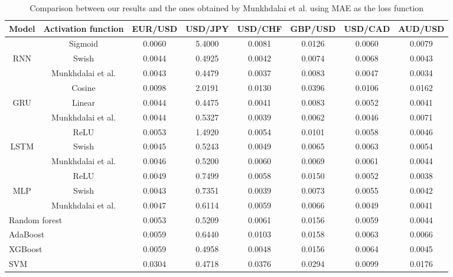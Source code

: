 ﻿\documentclass{ieeeaccess}
\begin{document}
\begin{table}[t]
  \caption{Comparison between our results and the ones obtained by Munkhdalai et al. using MAE as the loss function}
  \small
  \centering
  \begin{tabular*}{0.9\textwidth}{c @{\extracolsep{\fill}} ccccccc}
    \hline
    \textbf{Model} & \textbf{Activation function} & \textbf{EUR/USD} & \textbf{USD/JPY} & \textbf{USD/CHF} & \textbf{GBP/USD} & \textbf{USD/CAD} & \textbf{AUD/USD} \\
    \hline

          & Sigmoid & 0.0060 & 5.4000 & 0.0081 & 0.0126 & 0.0060 & 0.0079 \\
    RNN   & Swish & 0.0044 & 0.4925 & 0.0042 & 0.0074 & 0.0068 & 0.0043 \\
          & Munkhdalai et al. & 0.0043 & 0.4479 & 0.0037 & 0.0083 & 0.0047 & 0.0034 \\
    \hline
          & Cosine & 0.0098 & 2.0191 & 0.0130 & 0.0396 & 0.0106 & 0.0162 \\
    GRU   & Linear & 0.0044 & 0.4475 & 0.0041 & 0.0083 & 0.0052 & 0.0041 \\
          & Munkhdalai et al. & 0.0044 & 0.5327 & 0.0039 & 0.0062 & 0.0046 & 0.0071 \\
    \hline
          & ReLU & 0.0053 & 1.4920 & 0.0054 & 0.0101 & 0.0058 & 0.0046 \\
    LSTM  & Swish & 0.0045 & 0.5243 & 0.0049 & 0.0065 & 0.0063 & 0.0054 \\
          & Munkhdalai et al. & 0.0046 & 0.5200 & 0.0060 & 0.0069 & 0.0061 & 0.0044 \\
    \hline

          & ReLU & 0.0049 & 0.7499 & 0.0058 & 0.0150 & 0.0052 & 0.0038 \\
    MLP   & Swish & 0.0043 & 0.7351 & 0.0039 & 0.0073 & 0.0055 & 0.0042 \\
          & Munkhdalai et al. & 0.0047 & 0.6114 & 0.0059 & 0.0066 & 0.0049 & 0.0041 \\
          

    \hline

    \multicolumn{2}{l}{Random forest} & 0.0053 & 0.5209 & 0.0061 & 0.0156 & 0.0059 & 0.0044 \\
    \multicolumn{2}{l}{AdaBoost} & 0.0059 & 0.6440 & 0.0103 & 0.0158 & 0.0063 & 0.0066 \\
    \multicolumn{2}{l}{XGBoost} & 0.0059 & 0.4958 & 0.0048 & 0.0156 & 0.0064 & 0.0045 \\
    \multicolumn{2}{l}{SVM} & 0.0304 & 0.4718 & 0.0376 & 0.0294 & 0.0099 & 0.0176 \\


\end{tabular*}
\end{table}
\end{document}
